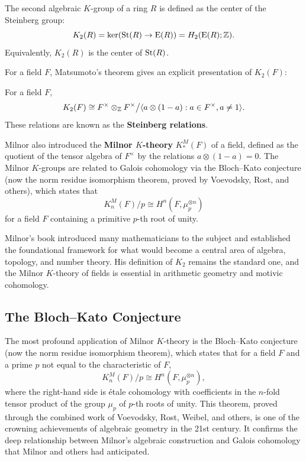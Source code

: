 \begin{definition}[Milnor's \(K_2\)]
The second algebraic \(K\)-group of a ring \(R\) is defined as the center of the Steinberg group:
\[
K_2(R) = \ker(\operatorname{St}(R) \to \operatorname{E}(R)) = H_2(\operatorname{E}(R); \mathbb{Z}).
\]
Equivalently, \(K_2(R)\) is the center of \(\operatorname{St}(R)\).
\end{definition}

For a field \(F\), Matsumoto's theorem gives an explicit presentation of \(K_2(F)\):

\begin{theorem}[Matsumoto, 1969]
For a field \(F\),
\[
K_2(F) \cong F^\times \otimes_{\mathbb{Z}} F^\times \big/ \langle a \otimes (1-a) : a \in F^\times, a \neq 1 \rangle.
\]
These relations are known as the \textbf{Steinberg relations}.
\end{theorem}

Milnor also introduced the \textbf{Milnor \(K\)-theory} \(K_*^M(F)\) of a field, defined as the quotient of the tensor algebra of \(F^\times\) by the relations \(a \otimes (1-a) = 0\). The Milnor \(K\)-groups are related to Galois cohomology via the Bloch--Kato conjecture (now the norm residue isomorphism theorem, proved by Voevodsky, Rost, and others), which states that
\[
K_n^M(F)/p \cong H^n(F, \mu_p^{\otimes n})
\]
for a field \(F\) containing a primitive \(p\)-th root of unity.

Milnor's book introduced many mathematicians to the subject and established the foundational framework for what would become a central area of algebra, topology, and number theory. His definition of \(K_2\) remains the standard one, and the Milnor \(K\)-theory of fields is essential in arithmetic geometry and motivic cohomology.

\subsection{The Bloch--Kato Conjecture}

The most profound application of Milnor \(K\)-theory is the Bloch--Kato conjecture (now the norm residue isomorphism theorem), which states that for a field \(F\) and a prime \(p\) not equal to the characteristic of \(F\),
\[
K_n^M(F)/p \cong H^n(F, \mu_p^{\otimes n}),
\]
where the right-hand side is \'etale cohomology with coefficients in the \(n\)-fold tensor product of the group \(\mu_p\) of \(p\)-th roots of unity. This theorem, proved through the combined work of Voevodsky, Rost, Weibel, and others, is one of the crowning achievements of algebraic geometry in the 21st century. It confirms the deep relationship between Milnor's algebraic construction and Galois cohomology that Milnor and others had anticipated.

